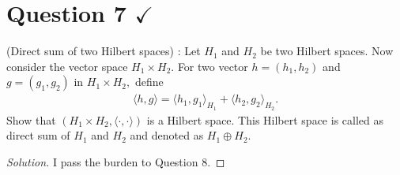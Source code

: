 \section{Question 7 \texorpdfstring{$\checkmark$}{}}

\horz

(Direct sum of two Hilbert spaces) : Let $H_1$ and $H_2$ be two Hilbert spaces. Now consider the vector space $H_1\times H_2.$ For two vector $h=(h_1,h_2)$ and $g=(g_1,g_2)$ in $H_1\times H_2,$ define
\begin{align*}
\langle h,g\rangle = \langle h_1,g_1\rangle_{H_1} + \langle h_2,g_2\rangle_{H_2}.
\end{align*}
Show that  $(H_1\times H_2, \langle \cdot,\cdot\rangle )$ is a Hilbert space. This Hilbert space is called as direct sum of $H_1$ and $H_2$ and denoted as $H_1\oplus H_2.$ 

\horz

\begin{proof}[Solution]
    I pass the burden to Question 8.
\end{proof}
